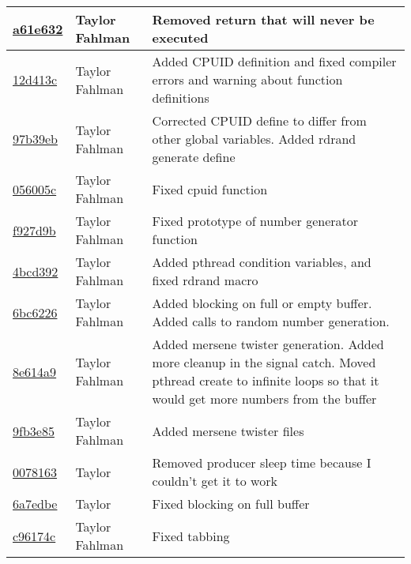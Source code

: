 \begin{tabular}{l l l}
\href{https://github.com/fahlmant/cs444/commit/a61e6320173be1ea668966396bb45bc7930d34f9}{a61e632} & Taylor Fahlman & Removed return that will never be executed\\\hline
\href{https://github.com/fahlmant/cs444/commit/12d413cdbc773bea9797fbc8ffc523df368cae5c}{12d413c} & Taylor Fahlman & Added CPUID definition and fixed compiler errors and warning about function definitions\\\hline
\href{https://github.com/fahlmant/cs444/commit/97b39ebde5ea4090c9371d7868ec9984c6230703}{97b39eb} & Taylor Fahlman & Corrected CPUID define to differ from other global variables. Added rdrand generate define\\\hline
\href{https://github.com/fahlmant/cs444/commit/056005ccb725e1ce91c211bb5cc71acdd3cfe5e4}{056005c} & Taylor Fahlman & Fixed cpuid function\\\hline
\href{https://github.com/fahlmant/cs444/commit/f927d9b39907620e959c235c9b56ab0160bbc366}{f927d9b} & Taylor Fahlman & Fixed prototype of number generator function\\\hline
\href{https://github.com/fahlmant/cs444/commit/4bcd392bf2941eb49cc82229be9495cd4c9f62ee}{4bcd392} & Taylor Fahlman & Added pthread condition variables, and fixed rdrand macro\\\hline
\href{https://github.com/fahlmant/cs444/commit/6bc6226e01a9a1302c741331cce8ab8256f399ce}{6bc6226} & Taylor Fahlman & Added blocking on full or empty buffer. Added calls to random number generation.\\\hline
\href{https://github.com/fahlmant/cs444/commit/8e614a90d9b3adfedea1214253801c36f17c6aea}{8e614a9} & Taylor Fahlman & Added mersene twister generation. Added more cleanup in the signal catch. Moved pthread create to infinite loops so that it would get more numbers from the buffer\\\hline
\href{https://github.com/fahlmant/cs444/commit/9fb3e850a20f58cd174a80bf580c150ebb8a8860}{9fb3e85} & Taylor Fahlman & Added mersene twister files\\\hline
\href{https://github.com/fahlmant/cs444/commit/007816390983ac7d562e8f9d4d31ff6abc7c40c8}{0078163} & Taylor & Removed producer sleep time because I couldn't get it to work\\\hline
\href{https://github.com/fahlmant/cs444/commit/6a7edbe421fb5e53a9a847a09117500c1ca1482e}{6a7edbe} & Taylor & Fixed blocking on full buffer\\\hline
\href{https://github.com/fahlmant/cs444/commit/c96174c136e9194fd83f4d5fee5927432468fdfd}{c96174c} & Taylor Fahlman & Fixed tabbing\\\hline

\end{tabular}
